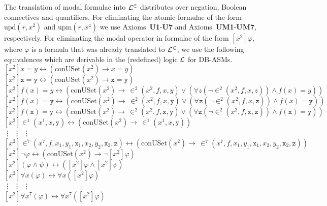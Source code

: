 \documentclass[preprint,11pt]{elsarticle}
\theoremstyle{definition}
\theoremstyle{remark}
\begin{document}
The translation of modal formulae into ${\cal L}^\in$ distributes over negation, Boolean connectives and quantifiers. For eliminating the atomic formulae of the form $\mathrm{upd}(r, x^2)$ and $\mathrm{upm}(r, x^4)$ we use Axioms~\textbf{U1}-\textbf{U7} and Axioms~\textbf{UM1}-\textbf{UM7}, respectively. For eliminating the modal operator in  formulae of the form $[x^2] \varphi$, where $\varphi$ is a formula that was already translated to ${\cal L}^\in$, we use the following equivalences which are derivable in the (redefined) logic ${\cal L}$ for DB-ASMs. \\[0.2cm]
$[x^2]x=y \leftrightarrow(\text{conUSet}(x^2)\rightarrow x=y)$ \\[0.2cm]
$[x^2]\mathtt{x}=\mathtt{y} \leftrightarrow(\text{conUSet}(x^2)\rightarrow \mathtt{x}=\mathtt{y})$ \\[0.2cm]
$[x^2]f(x)=y \leftrightarrow (\text{conUSet}(x^2)\rightarrow \, \in^2\!\!(x^2\!, f, x, y)\vee(\forall z (\neg \in^2\!\!(x^2\!, f, x, z)) \wedge f(x) = y))$\\[0.2cm]
$[x^2]f(x)=\mathtt{y} \leftrightarrow (\text{conUSet}(x^2)\rightarrow \, \in^2\!\!(x^2\!, f, x, \mathtt{y})\vee(\forall \mathtt{z} (\neg \in^2\!\!(x^2\!, f, x, \mathtt{z})) \wedge f(x) = \mathtt{y}))$\\[0.2cm]
$[x^2]f(\mathtt{x})=\mathtt{y} \leftrightarrow (\text{conUSet}(x^2)\rightarrow \, \in^2\!\!(x^2\!, f, \mathtt{x}, \mathtt{y})\vee(\forall \mathtt{z} (\neg \in^2\!\!(x^2\!, f, \mathtt{x}, \mathtt{z})) \wedge f(\mathtt{x}) = \mathtt{y}))$\\[0.2cm]
$[x^2]\in^1\!\!(x^1\!,x,\mathtt{y}) \leftrightarrow(\text{conUSet}(x^2)\rightarrow \,\in^1\!\!(x^1\!,x,\mathtt{y}))$ \\[0.2cm]
\hspace*{1cm} \vdots \hspace*{1.2cm} \vdots \hspace*{1.2cm} \vdots\\[0.2cm]
$[x^2]\in^7\!\!(x^7\!,f,x_1,y_1,\mathtt{x}_1, x_2,y_2,\mathtt{x}_2,\mathtt{z}) \leftrightarrow(\text{conUSet}(x^2)\rightarrow \,\in^7\!\!(x^7\!,f,x_1,y_1,\mathtt{x}_1, x_2,y_2,\mathtt{x}_2,\mathtt{z}))$ \\[0.2cm]
$[x^2]\neg\varphi \leftrightarrow(\text{conUSet}(x^2)\rightarrow \neg[x^2]\varphi)$ \\[0.2cm]
$[x^2](\varphi\wedge\psi) \leftrightarrow([x^2]\varphi\wedge[x^2]\psi)$ \\[0.2cm]
$[x^2]\forall x (\varphi) \leftrightarrow \forall x ([x^2]\varphi)$ \\[0.2cm]
\hspace*{0.5cm} \vdots \hspace*{1cm} \vdots \hspace*{0.8cm} \vdots\\[0.2cm]
$[x^2]\forall x^7 (\varphi) \leftrightarrow \forall x^7 ([x^2]\varphi)$ \\[0.2cm]
\end{document}

